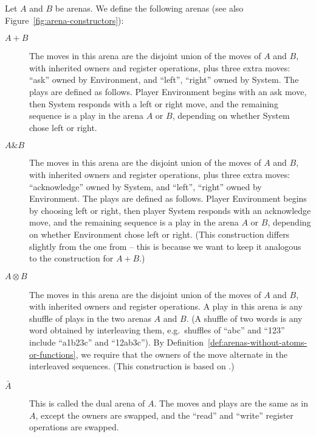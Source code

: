 \begin{definition}\label{def:composition-of-arenas}
    Let  $A$ and $B$ be arenas. We define the following arenas (see also Figure~\ref{fig:arena-constructors}):
        \begin{description}
            \item[$A+B$] The moves in this arena are the disjoint union of the moves of $A$ and $B$, with inherited owners and register operations, plus three extra moves: ``ask'' owned by Environment, and ``left'', ``right'' owned by System. 
            The plays are defined as follows. Player Environment begins with  an ask move, then System responds with a left or right move, and the remaining sequence is a play in the arena $A$ or $B$, depending on whether System chose left or right. 
            \item[$A \& B$] The moves in this arena are the disjoint union of the moves of $A$ and $B$, with inherited owners and register operations, plus three extra moves: ``acknowledge'' owned by System, and ``left'', ``right'' owned by Environment. 
            The plays are defined as follows. Player Environment begins by choosing left or right, then player System responds with an acknowledge move, and the remaining sequence is a play  in the arena $A$ or $B$, depending on whether Environment chose left or right.
            (This construction differs slightly from the one from \cite[Excercise~1.10]{abramsky2013semantics} -- this is because we want to keep it analogous to the construction for $A + B$.)
            \item[$A \otimes B$] The moves in this arena are the disjoint union of the moves of $A$ and $B$, with inherited owners and register operations. A play in this arena is any shuffle of plays in the two arenas $A$ and $B$. (A shuffle of two words is any word obtained by interleaving them, e.g.~shuffles of ``abc'' and ``123'' include ``a1b23c'' and ``12ab3c'').
            By Definition~\ref{def:arenas-without-atoms-or-functions}, we require that the owners of the move alternate in the 
            interleaved sequences. (This construction is based on \cite[p.7]{abramsky2013semantics}.) 
            

            \item[$\bar A$] This is called the dual arena of $A$. The moves and plays are the same as in $A$, except the owners are swapped, and the ``read'' and ``write'' register operations are swapped.
        \end{description} 
\end{definition}

